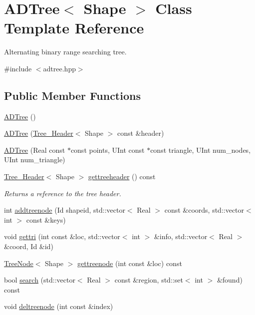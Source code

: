 \hypertarget{classADTree}{
\section{ADTree$<$ Shape $>$ Class Template Reference}
\label{classADTree}
}


Alternating binary range searching tree.  


{\ttfamily \#include $<$adtree.hpp$>$}\subsection*{Public Member Functions}
\begin{DoxyCompactItemize}
\item 
\hyperlink{classADTree_a77cc7dfe39cabdd41316ff2e7dcfccd0}{ADTree} ()
\item 
\hyperlink{classADTree_aa66f88d51019999814be20c17663fc29}{ADTree} (\hyperlink{classTree__Header}{Tree\_\-Header}$<$ Shape $>$ const \&header)
\item 
\hyperlink{classADTree_aec2a21cd072f346853968b5b9cf9cee5}{ADTree} (Real const $\ast$const points, UInt const $\ast$const triangle, UInt num\_\-nodes, UInt num\_\-triangle)
\item 
\hypertarget{classADTree_a56477de2e5128eba39c20000de2eb05b}{
\hyperlink{classTree__Header}{Tree\_\-Header}$<$ Shape $>$ \hyperlink{classADTree_a56477de2e5128eba39c20000de2eb05b}{gettreeheader} () const }
\label{classADTree_a56477de2e5128eba39c20000de2eb05b}

\begin{DoxyCompactList}\small\item\em Returns a reference to the tree header. \item\end{DoxyCompactList}\item 
int \hyperlink{classADTree_a4210646b297dd9b48c273ff2923a2b59}{addtreenode} (Id shapeid, std::vector$<$ Real $>$ const \&coords, std::vector$<$ int $>$ const \&keys)
\item 
void \hyperlink{classADTree_a1c1e6da98d9a00a17044d16849dfa2e8}{gettri} (int const \&loc, std::vector$<$ int $>$ \&info, std::vector$<$ Real $>$ \&coord, Id \&id)
\item 
\hyperlink{classTreeNode}{TreeNode}$<$ Shape $>$ \hyperlink{classADTree_a4dd7574cdb137f38611311083294a365}{gettreenode} (int const \&loc) const 
\item 
bool \hyperlink{classADTree_a1715508210a8a54094125997eb7e19d1}{search} (std::vector$<$ Real $>$ const \&region, std::set$<$ int $>$ \&found) const 
\item 
\hypertarget{classADTree_ad0a073992ca29fcc493d4b592a179f3e}{
void \hyperlink{classADTree_ad0a073992ca29fcc493d4b592a179f3e}{deltreenode} (int const \&index)}
\label{classADTree_ad0a073992ca29fcc493d4b592a179f3e}


\end{DoxyCompactItemize}
